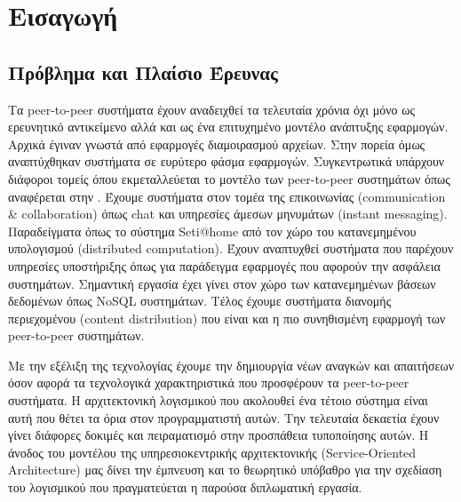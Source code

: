 \chapter{Εισαγωγή}
\label{chap:Intro}

\section{Πρόβλημα και Πλαίσιο Έρευνας}

Τα peer-to-peer συστήματα έχουν αναδειχθεί τα τελευταία χρόνια όχι μόνο 
ως ερευνητικό αντικείμενο αλλά και ως ένα επιτυχημένο μοντέλο ανάπτυξης 
εφαρμογών. Αρχικά έγιναν γνωστά από εφαρμογές διαμοιρασμού αρχείων. Στην 
πορεία όμως αναπτύχθηκαν συστήματα σε ευρύτερο φάσμα εφαρμογών. 
Συγκεντρωτικά υπάρχουν διάφοροι τομείς όπου εκμεταλλεύεται το μοντέλο 
των peer-to-peer συστημάτων όπως αναφέρεται στην 
\citep{Androutsellis-Theotokis2004}. Έχουμε συστήματα στον τομέα της 
επικοινωνίας (communication \& collaboration) όπως chat και υπηρεσίες 
άμεσων μηνυμάτων (instant messaging). Παραδείγματα όπως το σύστημα Seti@home 
από τον χώρο του κατανεμημένου υπολογισμού (distributed computation). 
Έχουν αναπτυχθεί συστήματα που παρέχουν υπηρεσίες υποστήριξης όπως για 
παράδειγμα εφαρμογές που αφορούν την ασφάλεια συστημάτων. Σημαντική 
εργασία έχει γίνει στον χώρο των κατανεμημένων βάσεων δεδομένων όπως 
NoSQL συστημάτων. Τέλος έχουμε συστήματα διανομής περιεχομένου (content 
distribution) που είναι και η πιο συνηθισμένη εφαρμογή των peer-to-peer 
συστημάτων.

Με την εξέλιξη της τεχνολογίας έχουμε την δημιουργία νέων αναγκών και 
απαιτήσεων όσον αφορά τα τεχνολογικά χαρακτηριστικά που προσφέρουν τα 
peer-to-peer συστήματα. Η αρχιτεκτονική λογισμικού που ακολουθεί ένα 
τέτοιο σύστημα είναι αυτή που θέτει τα όρια στον προγραμματιστή αυτών. 
Την τελευταία δεκαετία έχουν γίνει διάφορες δοκιμές και πειραματισμό 
στην προσπάθεια τυποποίησης αυτών. Η άνοδος του μοντέλου της 
υπηρεσιοκεντρικής αρχιτεκτονικής (Service-Oriented Architecture) μας 
δίνει την έμπνευση και το θεωρητικό υπόβαθρο για την σχεδίαση του 
λογισμικού που πραγματεύεται η παρούσα διπλωματική εργασία.

